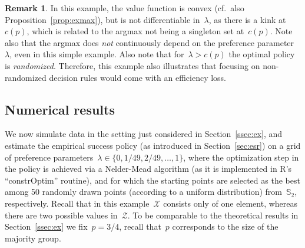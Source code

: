 \documentclass[11pt, a4paper]{article}
\theoremstyle{definition}
\newtheorem{remark}{Remark}[section]
\begin{document}
\begin{remark}\label{rem:ex}
In this example, the value function is convex (cf.~also Proposition~\ref{prop:exmax}), but is not differentiable in~$\lambda$, as there is a kink at~$c(p)$, which is related to the argmax not being a singleton set at~$c(p)$. Note also that the argmax does \emph{not} continuously depend on the preference parameter~$\lambda$, even in this simple example. Also note that for~$\lambda > c(p)$ the optimal policy is \emph{randomized}. Therefore, this example also illustrates that focusing on non-randomized decision rules would come with an efficiency loss.
\end{remark}


\subsection{Numerical results}\label{sec:num}

We now simulate data in the setting just considered in Section~\ref{ssec:ex}, and estimate the empirical success policy (as introduced in Section~\ref{sec:esr}) on a grid of preference parameters~$\lambda \in \{0, 1/49, 2/49, \hdots, 1\}$, where the optimization step in the policy is achieved via a Nelder-Mead algorithm (as it is implemented in R's ``constrOptim'' routine), and for which the starting points are selected as the best among 50 randomly drawn points (according to a uniform distribution) from~$\mathbb{S}_2$, respectively. Recall that in this example~$\mathcal{X}$ consists only of one element, whereas there are two possible values in~$\mathcal{Z}$. To be comparable to the theoretical results in Section~\ref{ssec:ex} we fix~$p  = 3/4$, recall that~$p$ corresponds to the size of the majority group.
\end{document}
